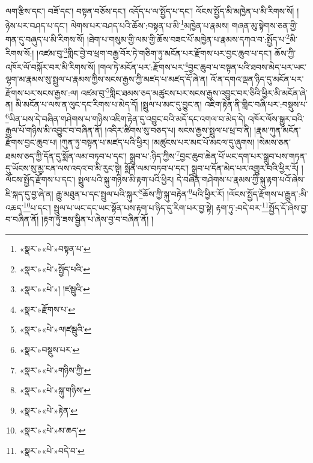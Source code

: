 ལག་རྩིས་དང་། བཟོ་དང་། བསྟན་བཅོས་དང་། འདོད་པ་ལ་སྤྱོད་པ་དང་། ལོངས་སྤྱོད་མི་མཁྱེན་པ་མི་རིགས་སོ། །ཉེས་པར་བཤད་པ་དང་། ལེགས་པར་བཤད་པའི་ཆོས་:བསྟན་པ་མི་\footnote{«སྣར་»«པེ་»བསྟན་པ་}མཁྱེན་པ་རྣམས། གཞན་མུ་སྟེགས་ཅན་གྱི་གན་དུ་བཞུད་པ་མི་རིགས་སོ། །ཐེག་པ་གསུམ་གྱི་ལམ་གྱི་ཆོས་བཟང་པོ་མཁྱེན་པ་རྣམས་དཀའ་བ་:སྤྱོད་པ་\footnote{«སྣར་»«པེ་»སྤྱོད་པའི་}མི་རིགས་སོ:། །འཛམ་བུ་\footnote{«སྣར་»«པེ་»། །ཛམྦུའི་}གླིང་བྱེ་བ་ཕྲག་བརྒྱ་བོར་ཏེ་གཅིག་ཏུ་མངོན་པར་རྫོགས་པར་བྱང་ཆུབ་པ་དང་། ཆོས་ཀྱི་འཁོར་ལོ་བསྐོར་བར་མི་རིགས་སོ། །གལ་ཏེ་མངོན་པར་:རྫོགས་པར་\footnote{«སྣར་»རྫོགས་པ་}བྱང་ཆུབ་པ་བསྟན་པའི་ཐབས་མེད་པར་ཡང་ལྷག་མ་རྣམས་སུ་སྤྲུལ་པ་རྣམས་ཀྱིས་སངས་རྒྱས་ཀྱི་མཛད་པ་མཛད་དོ་ཞེ་ན། འོ་ན་དགའ་ལྡན་ཉིད་དུ་མངོན་པར་རྫོགས་པར་སངས་རྒྱས་:ལ། འཛམ་བུ་\footnote{«སྣར་»«པེ་»ལ།ཛམྦུའི་}གླིང་ཐམས་ཅད་མཚུངས་པར་སངས་རྒྱས་འབྱུང་བར་ཅིའི་ཕྱིར་མི་མངོན་ཞེ་ན། མི་མངོན་པ་ལས་ན་ལུང་དང་རིགས་པ་མེད་དོ། །སྤྲུལ་པ་མང་དུ་བྱུང་ན། འཇིག་རྟེན་ནི་གླིང་བཞི་པར་:བསྡུས་པ་\footnote{«སྣར་»བསྡུས་པར་}ཡིན་པས་དེ་བཞིན་གཤེགས་པ་གཉིས་འཇིག་རྟེན་དུ་འབྱུང་བའི་མདོ་དང་འགལ་བ་མེད་དེ། འཁོར་ལོས་སྒྱུར་བའི་རྒྱལ་པོ་གཉིས་མི་འབྱུང་བ་བཞིན་ནོ། །འདིར་ཚིགས་སུ་བཅད་པ། སངས་རྒྱས་སྤྲུལ་པ་ཕྲ་བ་ནི། །རྣམ་ཀུན་མངོན་རྫོགས་བྱང་ཆུབ་པ། །ཀུན་ཏུ་བསྟན་པ་མཛད་པའི་ཕྱིར། །མཚུངས་པར་མང་པོ་མངལ་དུ་ཞུགས། །སེམས་ཅན་ཐམས་ཅད་ཀྱི་དོན་དུ་སྨོན་ལམ་བཏབ་པ་དང་། སྒྲུབ་པ་:ཉིད་ཀྱིས་\footnote{«སྣར་»«པེ་»གཉིས་ཀྱི་}བྱང་ཆུབ་ཆེན་པོ་ཡང་དག་པར་སྒྲུབ་པས་གཏན་དུ་ཡོངས་སུ་མྱ་ངན་ལས་འདའ་བ་མི་རུང་སྟེ། སྨོན་ལམ་བཏབ་པ་དང་། སྒྲུབ་པ་དོན་མེད་པར་འགྱུར་བའི་ཕྱིར་རོ། །ལོངས་སྤྱོད་རྫོགས་པ་དང་། སྤྲུལ་པའི་སྐུ་གཉིས་མི་རྟག་པའི་ཕྱིར། དེ་བཞིན་གཤེགས་པ་རྣམས་ཀྱི་སྐུ་རྟག་པའོ་ཞེས་ཇི་སྐད་དུ་བྱ་ཞེ་ན། རྒྱུ་མཐུན་པ་དང་སྤྲུལ་པའི་སྐུར་\footnote{«སྣར་»«པེ་»སྐུ་གཉིས་}ཆོས་ཀྱི་སྐུ་བརྟེན་\footnote{«སྣར་»«པེ་»རྟེན་}པའི་ཕྱིར་རོ། །ལོངས་སྤྱོད་རྫོགས་པ་རྒྱུན་:མི་འཆད་\footnote{«སྣར་»«པེ་»མ་ཆད་}པ་དང་། སྤྲུལ་པ་ཡང་དང་ཡང་སྟོན་པས་རྟག་པ་ཉིད་དུ་རིག་པར་བྱ་སྟེ། རྟག་ཏུ་:བདེ་བར་\footnote{«སྣར་»«པེ་»བདེ་བ་}སྤྱོད་དོ་ཞེས་བྱ་བ་བཞིན་ནོ། །རྟག་ཏུ་ཟས་སྦྱིན་པ་ཞེས་བྱ་བ་བཞིན་ནོ། །
